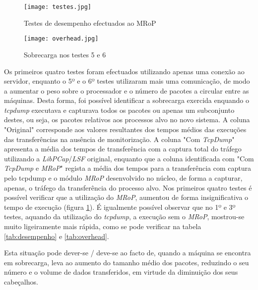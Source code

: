 \begin{figure}[!ht]
\centering
\texttt{[image: testes.jpg]}
\caption{Testes de desempenho efectuados ao MRoP}
\label{fig:tests_graphics}
\end{figure}

\begin{figure}[!ht]
\centering
\texttt{[image: overhead.jpg]}
\caption{Sobrecarga nos testes 5 e 6 }
\label{fig:tests_overhead}
\end{figure}

Os primeiros quatro testes foram efectuados utilizando apenas uma conexão ao servidor, enquanto o 5º e o 6º testes utilizaram mais uma comunicação, de modo a aumentar o peso sobre o processador e o número de pacotes a circular entre as máquinas.
Desta forma, foi possível identificar a sobrecarga exercida enquando o \textit{tcpdump} executava e capturava todos os pacotes ou apenas um subconjunto destes, ou seja, os pacotes relativos aos processos alvo no novo sistema.
A coluna "Original" corresponde aos valores resultantes dos tempos médios das execuções das transferências na ausência de monitorização.
A coluna "Com \textit{TcpDump}" apresenta a média dos tempos de transferência com a captura total do tráfego utilizando a \textit{LibPCap}/\textit{LSF} original, enquanto que a coluna identificada com "Com \textit{TcpDump} e \textit{MRoP}" regista a média dos tempos para a transferência com captura pelo tcpdump e o módulo \textit{MRoP} desenvolvido no núcleo, de forma a capturar, apenas, o tráfego da transferência do processo alvo.
Nos primeiros quatro testes é possível verificar que a utilização do \textit{MRoP}, aumentou de forma insignificativa o tempo de execução (figura \ref{fig:tests_graphics}).
É igualmente possível observar que no 1º e 3º testes, aquando da utilização do \textit{tcpdump}, a execução sem o \textit{MRoP}, mostrou-se muito ligeiramente mais rápida, como se pode verificar na tabela \ref{tab:desempenho} e \ref{tab:overhead}.


Esta situação pode dever-se / deve-se ao facto de, quando a máquina se encontra em sobrecarga, leva ao aumento do tamanho médio dos pacotes, reduzindo o seu número e o volume de dados transferidos, em virtude da diminuição dos seus cabeçalhos.

